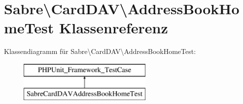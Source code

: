 \hypertarget{class_sabre_1_1_card_d_a_v_1_1_address_book_home_test}{}\section{Sabre\textbackslash{}Card\+D\+AV\textbackslash{}Address\+Book\+Home\+Test Klassenreferenz}
\label{class_sabre_1_1_card_d_a_v_1_1_address_book_home_test}
Klassendiagramm für Sabre\textbackslash{}Card\+D\+AV\textbackslash{}Address\+Book\+Home\+Test\+:\begin{figure}[H]
\begin{center}
\leavevmode
\includegraphics[height=2.000000cm]{class_sabre_1_1_card_d_a_v_1_1_address_book_home_test}
\end{center}
\end{figure}
